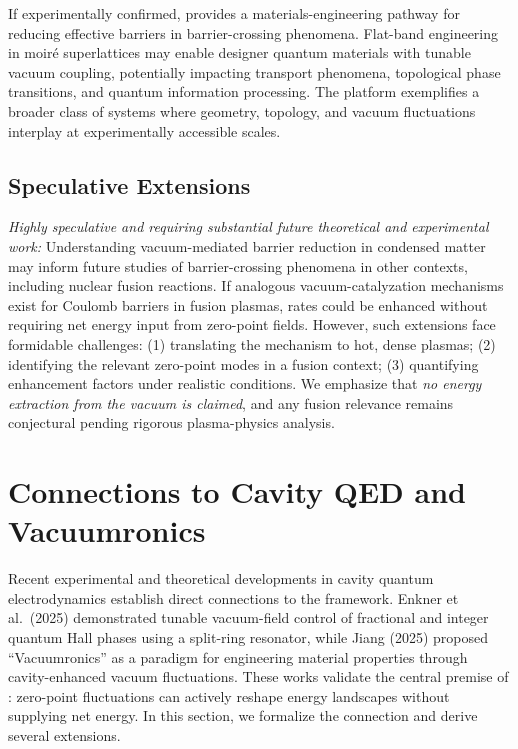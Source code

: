 \documentclass[11pt,letterpaper]{article}
\begin{document}
If experimentally confirmed, \QVC{} provides a materials-engineering pathway for reducing effective barriers in barrier-crossing phenomena. Flat-band engineering in moiré superlattices may enable designer quantum materials with tunable vacuum coupling, potentially impacting transport phenomena, topological phase transitions, and quantum information processing. The \TEVC{} platform exemplifies a broader class of systems where geometry, topology, and vacuum fluctuations interplay at experimentally accessible scales.

\subsection{Speculative Extensions}

\textit{Highly speculative and requiring substantial future theoretical and experimental work:} Understanding vacuum-mediated barrier reduction in condensed matter may inform future studies of barrier-crossing phenomena in other contexts, including nuclear fusion reactions. If analogous vacuum-catalyzation mechanisms exist for Coulomb barriers in fusion plasmas, rates could be enhanced without requiring net energy input from zero-point fields. However, such extensions face formidable challenges: (1) translating the \TEVC{} mechanism to hot, dense plasmas; (2) identifying the relevant zero-point modes in a fusion context; (3) quantifying enhancement factors under realistic conditions. We emphasize that \textit{no energy extraction from the vacuum is claimed}, and any fusion relevance remains conjectural pending rigorous plasma-physics analysis.

\section{Connections to Cavity QED and Vacuumronics}
\label{sec:cavity_qvc}

Recent experimental and theoretical developments in cavity quantum electrodynamics establish direct connections to the \QVC{} framework. Enkner et al.\ (2025)\cite{Enkner2025} demonstrated tunable vacuum-field control of fractional and integer quantum Hall phases using a split-ring resonator, while Jiang (2025)\cite{Jiang2025} proposed ``Vacuumronics'' as a paradigm for engineering material properties through cavity-enhanced vacuum fluctuations. These works validate the central premise of \QVC{}: zero-point fluctuations can actively reshape energy landscapes without supplying net energy. In this section, we formalize the connection and derive several extensions.
\end{document}
